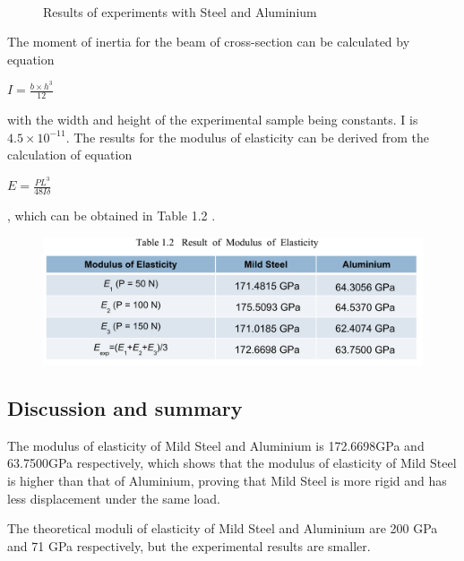 \begin{figure}
 	\\
 		\centering
 	\caption{Results of experiments with Steel and Aluminium} %
 	\label{F 1.1}
 \end{figure}

 

The moment of inertia for the beam of cross-section can be calculated by equation \begin{large}
$I=\frac{b\times h^3}{12}$
\end{large} with the width and height of the experimental sample being constants. I is $4.5\times \textbf{}10^{-11}$. The results for the modulus of elasticity can be derived from the calculation of equation \begin{large}$E=\frac{PL^3}{48I\delta}$ \end{large}, which can be obtained in Table 1.2 .
\begin{figure}
	\centering
	\includegraphics[width=1.0\linewidth]{"Mathematical_model/figures/modulus of elasticity"}
	\caption*{}
	\label{T 1.2}
\end{figure}
\subsection{Discussion and summary}
The modulus of elasticity of Mild Steel and Aluminium is 172.6698GPa and 63.7500GPa respectively, which shows that the modulus of elasticity of Mild Steel is higher than that of Aluminium, proving that Mild Steel is more rigid and has less displacement under the same load.

The theoretical moduli of elasticity of Mild Steel and Aluminium are 200 GPa and 71 GPa respectively, but the experimental results are smaller.


\FloatBarrier
